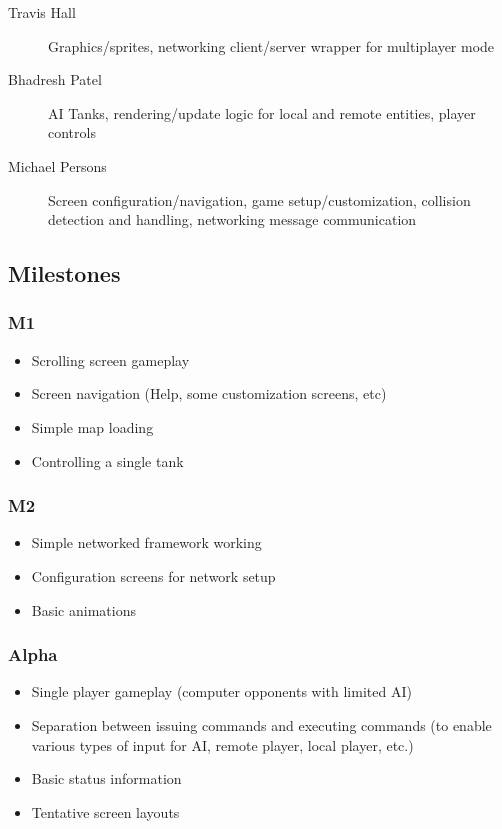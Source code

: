 \documentclass[letterpaper,11pt,twoside]{article}
\begin{document}
\begin{description}
 \item[Travis Hall] Graphics/sprites, networking client/server wrapper for multiplayer mode
 \item[Bhadresh Patel] AI Tanks, rendering/update logic for local and remote entities, player controls
 \item[Michael Persons] Screen configuration/navigation, game setup/customization, collision detection and handling, networking message communication
\end{description}

\subsection{Milestones}

\subsubsection{M1}
\begin{itemize}
 \item Scrolling screen gameplay
 \item Screen navigation (Help, some customization screens, etc)
 \item Simple map loading
 \item Controlling a single tank
\end{itemize}

\subsubsection{M2}
\begin{itemize}
 \item Simple networked framework working
 \item Configuration screens for network setup
 \item Basic animations
\end{itemize}

\subsubsection{Alpha}
\begin{itemize}
 \item Single player gameplay (computer opponents with limited AI)
 \item Separation between issuing commands and executing commands (to enable various types of input for AI, remote player, local player, etc.)
 \item Basic status information
 \item Tentative screen layouts
\end{itemize}
\end{document}
